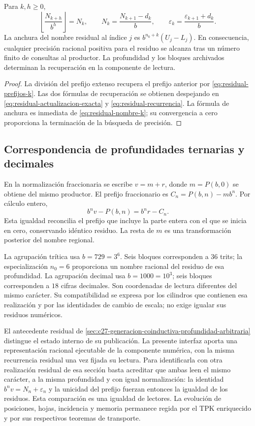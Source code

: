 \begin{corollary}
\label{cor:residual-recuperacion}
Para \(k,h\geq0\),
\[
 \left\lfloor\frac{N_{k+h}}{b^h}\right\rfloor=N_k,
 \qquad N_k=\frac{N_{k+1}-d_k}{b},
 \qquad \varepsilon_k=\frac{\varepsilon_{k+1}+d_k}{b}.
\]
La anchura del nombre residual al índice \(j\) es
\(b^{n_0+k}(U_j-L_j)\). En consecuencia, cualquier precisión racional
positiva para el residuo se alcanza tras un número finito de consultas al
productor. La profundidad y los bloques archivados determinan la
recuperación en la componente de lectura.
\end{corollary}
\begin{proof}
La división del prefijo extenso recupera el prefijo anterior por
\eqref{eq:residual-prefijos-k}. Las dos fórmulas de recuperación se
obtienen despejando en \eqref{eq:residual-actualizacion-exacta} y
\eqref{eq:residual-recurrencia}. La fórmula de anchura es inmediata de
\eqref{eq:residual-nombre-k}; su convergencia a cero proporciona la
terminación de la búsqueda de precisión.
\end{proof}

\subsection{Correspondencia de profundidades ternarias y decimales}
\label{subsec:residual-bases}

En la normalización fraccionaria se escribe \(v=m+r\), donde
\(m=P(b,0)\) se obtiene del mismo productor. El prefijo fraccionario es
\(C_n=P(b,n)-mb^n\). Por cálculo entero,
\[
 b^n v-P(b,n)=b^n r-C_n.
\]
Esta igualdad reconcilia el prefijo que incluye la parte entera con el que
se inicia en cero, conservando idéntico residuo. La resta de \(m\)
es una transformación posterior del nombre regional.

La agrupación trítica usa \(b=729=3^6\). Seis bloques corresponden a
\(36\) trits; la especialización \(n_0=6\) proporciona un nombre
racional del residuo de esa profundidad. La agrupación decimal usa
\(b=1000=10^3\); seis bloques corresponden a \(18\) cifras decimales.
Son coordenadas de lectura diferentes del mismo carácter. Su compatibilidad
se expresa por los cilindros que contienen esa realización y por las
identidades de cambio de escala; no exige igualar sus residuos numéricos.

El antecedente residual de
\cref{sec:c27-generacion-coinductiva-profundidad-arbitraria} distingue el
estado interno de su publicación. La presente interfaz aporta una
representación racional ejecutable de la componente numérica, con la misma
recurrencia residual una vez fijada su lectura. Para identificarla con otra
realización residual de esa sección basta acreditar que ambas leen el mismo
carácter, a la misma profundidad y con igual normalización: la identidad
\(b^n v=N_n+\varepsilon_n\) y la unicidad del prefijo fuerzan entonces
la igualdad de los residuos. Esta comparación es una igualdad de lectores.
La evolución de posiciones, hojas, incidencia y memoria permanece regida
por el TPK enriquecido y por sus respectivos teoremas de transporte.

